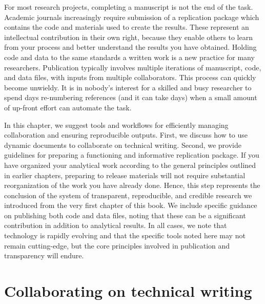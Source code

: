 
\begin{fullwidth}
For most research projects, completing a manuscript is not the end of the task.
Academic journals increasingly require submission of a replication package
which contains the code and materials used to create the results.
These represent an intellectual contribution in their own right,
because they enable others to learn from your process
and better understand the results you have obtained.
Holding code and data to the same standards a written work
is a new practice for many researchers.
Publication typically involves multiple iterations of manuscript, 
code, and data files, with inputs from multiple collaborators.
This process can quickly become unwieldy. 
It is in nobody's interest for a skilled and busy researcher
to spend days re-numbering references (and it can take days)
when a small amount of up-front effort can automate the task.

In this chapter, we suggest tools and workflows for efficiently managing collaboration
and ensuring reproducible outputs.
First, we discuss how to use dynamic documents to collaborate on technical writing.
Second, we provide guidelines for preparing a functioning and informative replication package.
If you have organized your analytical work
according to the general principles outlined in earlier chapters,
preparing to release materials will not require
substantial reorganization of the work you have already done.
Hence, this step represents the conclusion of the system
of transparent, reproducible, and credible research we introduced
from the very first chapter of this book.
We include specific guidance on publishing both code and data files,
noting that these can be a significant contribution in addition to analytical results.
In all cases, we note that technology is rapidly evolving
and that the specific tools noted here may not remain cutting-edge,
but the core principles involved in publication and transparency will endure.
\end{fullwidth}


\section{Collaborating on technical writing}

